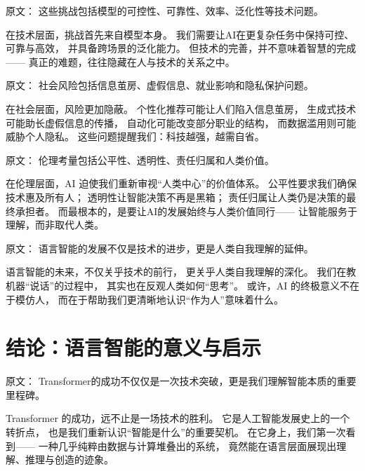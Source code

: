 原文：
这些挑战包括模型的可控性、可靠性、效率、泛化性等技术问题。  

在技术层面，挑战首先来自模型本身。  
我们需要让AI在更复杂任务中保持可控、可靠与高效，  
并具备跨场景的泛化能力。  
但技术的完善，并不意味着智慧的完成——  
真正的难题，往往隐藏在人与技术的关系之中。  



原文：
社会风险包括信息茧房、虚假信息、就业影响和隐私保护问题。  

在社会层面，风险更加隐蔽。  
个性化推荐可能让人们陷入信息茧房，  
生成式技术可能助长虚假信息的传播，  
自动化可能改变部分职业的结构，  
而数据滥用则可能威胁个人隐私。  
这些问题提醒我们：科技越强，越需自省。  



原文：
伦理考量包括公平性、透明性、责任归属和人类价值。  

在伦理层面，AI 迫使我们重新审视“人类中心”的价值体系。  
公平性要求我们确保技术惠及所有人；  
透明性让智能决策不再是黑箱；  
责任归属让人类仍是决策的最终承担者。  
而最根本的，是要让AI的发展始终与人类价值同行——  
让智能服务于理解，而非取代人类。  



原文：
语言智能的发展不仅是技术的进步，更是人类自我理解的延伸。  

语言智能的未来，不仅关乎技术的前行，  
更关乎人类自我理解的深化。  
我们在教机器“说话”的过程中，  
其实也在反观人类如何“思考”。  
或许，AI 的终极意义不在于模仿人，  
而在于帮助我们更清晰地认识“作为人”意味着什么。  


\section{结论：语言智能的意义与启示}



原文：
Transformer的成功不仅仅是一次技术突破，更是我们理解智能本质的重要里程碑。  

Transformer 的成功，远不止是一场技术的胜利。  
它是人工智能发展史上的一个转折点，  
也是我们重新认识“智能是什么”的重要契机。  
在它身上，我们第一次看到——  
一种几乎纯粹由数据与计算堆叠出的系统，  
竟然能在语言层面展现出理解、推理与创造的迹象。  



